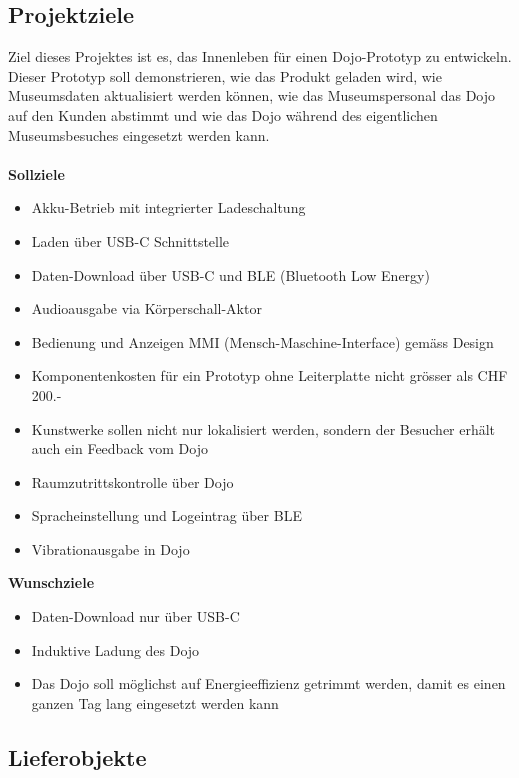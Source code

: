 \documentclass[10pt,a4paper,oneside]{99_fhnwreport}
\begin{document}
\subsection{Projektziele}
Ziel dieses Projektes ist es, das Innenleben für einen Dojo-Prototyp zu entwickeln. Dieser Prototyp soll demonstrieren, wie das Produkt geladen wird, wie Museumsdaten aktualisiert werden können, wie das Museumspersonal das Dojo auf den Kunden abstimmt und wie das Dojo während des eigentlichen Museumsbesuches eingesetzt werden kann.\\
\\
\textbf{Sollziele}
\begin{itemize}
\item{Akku-Betrieb mit integrierter Ladeschaltung}
\item{Laden über USB-C Schnittstelle}
\item{Daten-Download über USB-C und BLE (Bluetooth Low Energy)}
\item{Audioausgabe via Körperschall-Aktor}
\item{Bedienung und Anzeigen MMI (Mensch-Maschine-Interface) gemäss Design}
\item{Komponentenkosten für ein Prototyp ohne Leiterplatte nicht grösser als CHF 200.- }
\item{Kunstwerke sollen nicht nur lokalisiert werden, sondern der Besucher erhält auch ein Feedback vom Dojo}
\item{Raumzutrittskontrolle über Dojo}
\item{Spracheinstellung und Logeintrag über BLE}
\item{Vibrationausgabe in Dojo}
\end{itemize}

\textbf{Wunschziele}
\begin{itemize}
\item{Daten-Download nur über USB-C}
\item{Induktive Ladung des Dojo}
\item{Das Dojo soll möglichst auf Energieeffizienz getrimmt werden, damit es einen ganzen Tag lang eingesetzt werden kann}
\end{itemize}

\subsection{Lieferobjekte}
\end{document}
